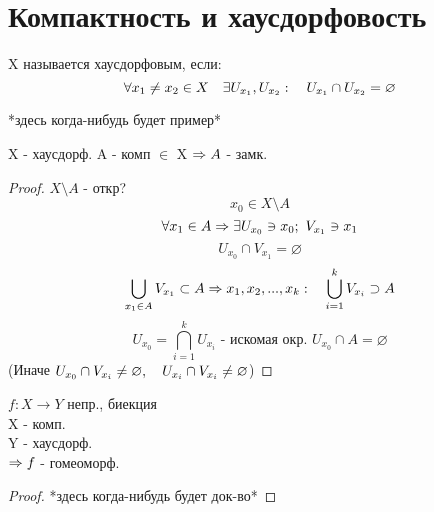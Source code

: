 \documentclass[geometry.tex]{subfiles}
\begin{document}
  \section{Компактность и хаусдорфовость}

  \begin{definition}
      X называется хаусдорфовым, если:\\
      \[\forall x_1 \neq x_2 \in X \quad \exists U_{x_1}, U_{x_2}: \quad U_{x_1} \cap U_{x_2} = \varnothing\]
  \end{definition}

  \begin{example}
    *здесь когда-нибудь будет пример*
  \end{example}

  \begin{theorem}
      X - хаусдорф. A - комп $\in$ X $\Rightarrow A$ - замк.
  \end{theorem}

  \begin{proof}
      $X \setminus A$ - откр?
      \[x_0 \in X \setminus A\]
      \[\forall x_1 \in A \Rightarrow \exists U_{x_0} \ni x_0; \ V_{x_1} \ni x_1\]
      \[U_{x_0} \cap V_{x_1} = \varnothing\]
      \[\bigcup_{x_1 \in A} V_{x_1} \subset A \Rightarrow x_1, x_2, ..., x_k:
      \quad \bigcup_{i = 1}^k V_{x_i} \supset A\]
      \[U_{x_0} = \bigcap_{i = 1}^k U_{x_i} \text{ - искомая окр.  } U_{x_0} \cap A = \varnothing\]
      (Иначе $U_{x_0} \cap V_{x_i} \neq \varnothing, \quad U_{x_i} \cap V_{x_i} \neq \varnothing$)
  \end{proof}

  \begin{theorem}
      $f: X \rightarrow Y$ непр., биекция\\
      X - комп.\\
      Y - хаусдорф.\\
      $\Rightarrow f$ - гомеоморф.
  \end{theorem}

  \begin{proof}
      *здесь когда-нибудь будет док-во*
  \end{proof}
\end{document}
